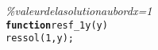 {\begin{tabbing}
\textit{\%\phantom{x}valeur\phantom{x}de\phantom{x}la\phantom{x}solution\phantom{x}au\phantom{x}bord\phantom{x}x{=}1}\\
\texttt{\textbf{function}}\texttt{\phantom{x}res\phantom{x}{=}\phantom{x}f\_{}1y{(}y{)}}\\
\texttt{res\phantom{x}{=}\phantom{x}sol{(}1{,}y{)}{;}}
\end{tabbing}}
